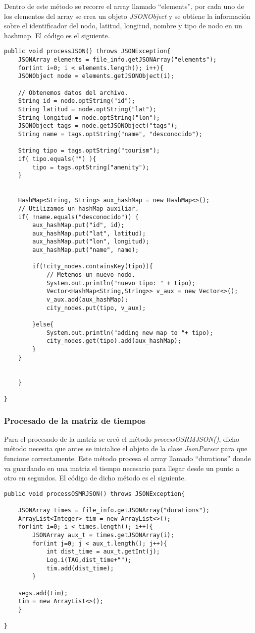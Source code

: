Dentro de este método se recorre el array llamado \enquote{elements}, por cada uno de los elementos del array se crea un objeto \textit{JSONObject} y se obtiene la información sobre el identificador del nodo, latitud, longitud, nombre y tipo de nodo en un hashmap. El código es el siguiente.\newline
\begin{lstlisting}[caption=Función para procesar información sobre puntos de interés y alojamientos]
public void processJSON() throws JSONException{
	JSONArray elements = file_info.getJSONArray("elements");
	for(int i=0; i < elements.length(); i++){
	JSONObject node = elements.getJSONObject(i);
	
	// Obtenemos datos del archivo.
	String id = node.optString("id");
	String latitud = node.optString("lat");
	String longitud = node.optString("lon");
	JSONObject tags = node.getJSONObject("tags");
	String name = tags.optString("name", "desconocido");
	
	String tipo = tags.optString("tourism");
	if( tipo.equals("") ){
		tipo = tags.optString("amenity");
	}
	
	
	HashMap<String, String> aux_hashMap = new HashMap<>();
	// Utilizamos un hashMap auxiliar.
	if( !name.equals("desconocido")) {
		aux_hashMap.put("id", id);
		aux_hashMap.put("lat", latitud);
		aux_hashMap.put("lon", longitud);
		aux_hashMap.put("name", name);
		
		if(!city_nodes.containsKey(tipo)){
			// Metemos un nuevo nodo.
			System.out.println("nuevo tipo: " + tipo);
			Vector<HashMap<String,String>> v_aux = new Vector<>();
			v_aux.add(aux_hashMap);
			city_nodes.put(tipo, v_aux);
		
		}else{
			System.out.println("adding new map to "+ tipo);
			city_nodes.get(tipo).add(aux_hashMap);
		}
	}
	
	
	}

}
\end{lstlisting}
\subsubsection{Procesado de la matriz de tiempos}
Para el procesado de la matriz se creó el método \textit{processOSRMJSON()}, dicho método necesita que antes se inicialice el objeto de la clase \textit{JsonParser} para que funcione correctamente.
Este método procesa el array llamado \enquote{durations} donde va guardando en una matriz el tiempo necesario para llegar desde un punto a otro en segundos. El código de dicho método es el siguiente.
\begin{lstlisting}[caption=Función para procesar matriz de tiempos entre puntos]
public void processOSMRJSON() throws JSONException{

	JSONArray times = file_info.getJSONArray("durations");
	ArrayList<Integer> tim = new ArrayList<>();
	for(int i=0; i < times.length(); i++){
		JSONArray aux_t = times.getJSONArray(i);
		for(int j=0; j < aux_t.length(); j++){
			int dist_time = aux_t.getInt(j);
			Log.i(TAG,dist_time+"");
			tim.add(dist_time);
		}
	
	segs.add(tim);
	tim = new ArrayList<>();
	}

}
\end{lstlisting}
